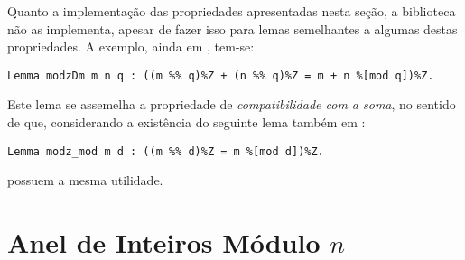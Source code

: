 Quanto a implementação das propriedades apresentadas nesta seção, a biblioteca não as implementa, apesar de fazer isso para lemas semelhantes a algumas destas propriedades. A exemplo, ainda em \cite{mathcomp-intdiv}, tem-se:
    \begin{lstlisting}[language=coq,frame=single,tabsize=1]
Lemma modzDm m n q : ((m %% q)%Z + (n %% q)%Z = m + n %[mod q])%Z.
    \end{lstlisting}
Este lema se assemelha a propriedade de \textit{compatibilidade com a soma}, no sentido de que, considerando a existência do seguinte lema também em \cite{mathcomp-intdiv}:
    \begin{lstlisting}[language=coq,frame=single,tabsize=1]
Lemma modz_mod m d : ((m %% d)%Z = m %[mod d])%Z.
    \end{lstlisting}
possuem a mesma utilidade. 


\section{Anel de Inteiros Módulo $n$}

